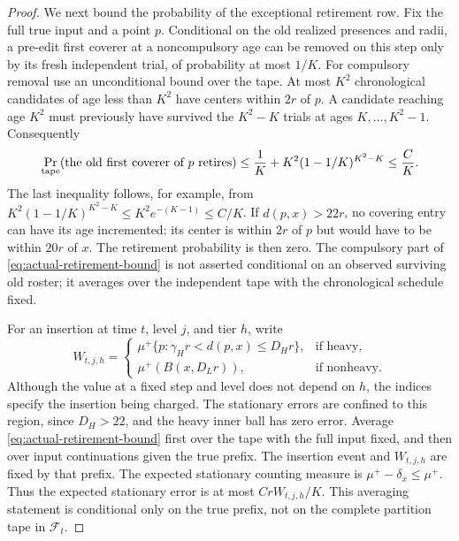 \begin{proof}
We next bound the probability of the exceptional retirement row.  Fix
the full true input and a point \(p\).  Conditional on the old realized
presences and radii, a pre-edit first coverer at a noncompulsory age can
be removed on this step only by its fresh independent trial, of
probability at most \(1/K\).  For compulsory removal use an
unconditional bound over the tape.  At most \(K^2\) chronological
candidates of age less than \(K^2\) have centers within \(2r\) of
\(p\).  A candidate reaching age \(K^2\) must previously have survived
the \(K^2-K\) trials at ages \(K,\ldots,K^2-1\).  Consequently
\begin{equation}\label{eq:actual-retirement-bound}
 \Pr_{\rm tape}(\text{the old first coverer of }p\text{ retires})
 \le\frac1K+K^2(1-1/K)^{K^2-K}\le\frac{C}{K}.
\end{equation}
The last inequality follows, for example, from
\(K^2(1-1/K)^{K^2-K}\le K^2e^{-(K-1)}\le C/K\).
If \(d(p,x)>22r\), no covering entry can have its age incremented:
its center is within \(2r\) of \(p\) but would have to be within
\(20r\) of \(x\).  The retirement probability is then zero.
The compulsory part of \eqref{eq:actual-retirement-bound} is not asserted
conditional on an observed surviving old roster; it averages over the
independent tape with the chronological schedule fixed.

For an insertion at time \(t\), level \(j\), and tier \(h\), write
\begin{equation}\label{eq:tier-insertion-mass}
 W_{t,j,h}=
 \begin{cases}
 \mu^+\{p:\gamma_Hr<d(p,x)\le D_Hr\},&\text{if heavy},\\
 \mu^+(B(x,D_Lr)),&\text{if nonheavy}.
 \end{cases}
\end{equation}
Although the value at a fixed step and level does not depend on \(h\),
the indices specify the insertion being charged.  The stationary errors
are confined to this region, since \(D_H>22\), and the heavy inner ball
has zero error.  Average \eqref{eq:actual-retirement-bound} first over
the tape with the full input fixed, and then over input continuations
given the true prefix.  The insertion event and \(W_{t,j,h}\) are
fixed by that prefix.  The expected stationary counting measure is
\(\mu^+-\delta_x\le\mu^+\).  Thus the expected stationary error is
at most \(CrW_{t,j,h}/K\).  This averaging statement is conditional
only on the true prefix, not on the complete partition tape in
\(\mathcal F_t\).


\end{proof}
